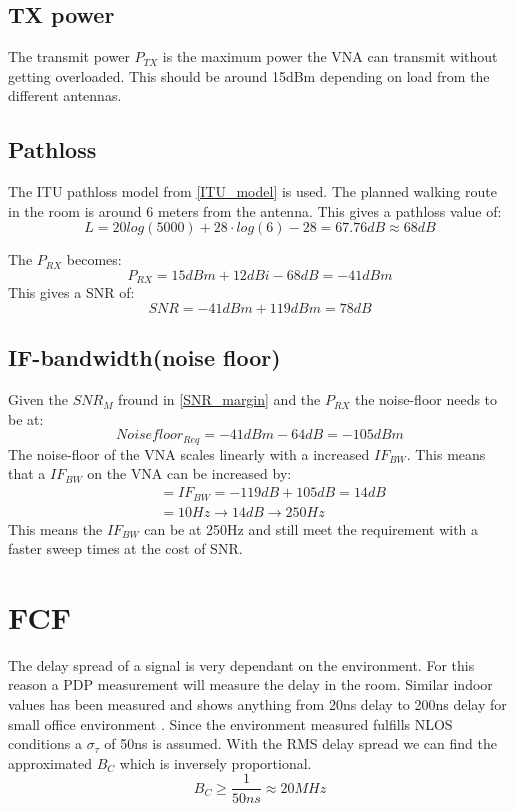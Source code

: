 \subsection{TX power}
The transmit power $P_{TX}$ is the maximum power the VNA can transmit without getting overloaded. This should be around 15dBm \citep{Key_PNA} depending on load from the different antennas.
\subsection{Pathloss}
The ITU pathloss model from \autoref{ITU_model} is used. The planned walking route in the room is around 6 meters from the antenna. This gives a pathloss value of:
\begin{equation}
L = 20log (5000) + 28 \cdot log(6)-28 = 67.76dB \approx 68dB
\label{eq:path_loss}
\end{equation}

The $P_{RX}$ becomes:
\begin{equation}
P_{RX} = 15dBm + 12dBi - 68dB = -41dBm
\end{equation}
This gives a SNR of:
\begin{equation}
SNR = -41dBm+119dBm = 78dB
\end{equation}


\subsection{IF-bandwidth(noise floor)}
Given the $SNR_{M}$ fround in \autoref{SNR_margin} and the $P_{RX}$ the noise-floor needs to be at:
\begin{equation}
Noisefloor_{Req} = -41dBm-64dB = -105dBm 
\end{equation}
The noise-floor of the \gls{VNA} scales linearly with a increased $IF_{BW}$\citep{PNA_scale}. This means that a $IF_{BW}$ on the \gls{VNA} can be increased by:
\begin{equation}
\begin{split}
&= IF_{BW} = -119dB+105dB = 14dB \\
          \quad &= 10Hz \rightarrow 14dB \rightarrow 250Hz
\end{split}
\end{equation}
This means the $IF_{BW}$ can be at 250Hz and still meet the requirement with a faster sweep times at the cost of SNR.
\section{FCF}
The delay spread of a signal is very dependant on the environment. For this reason a PDP measurement will measure the delay in the room. Similar indoor values has been measured and shows anything from 20ns delay to 200ns delay for small office environment \citep{indoor_delay}. Since the environment  measured fulfills NLOS conditions a $\sigma_{\tau}$ of 50ns is assumed. With the RMS delay spread we can find the approximated $B_C$ which is inversely proportional. 
\begin{equation}
B_C \geq \frac{1}{50ns} \approx 20MHz
\label{CohBW}
\end{equation}
